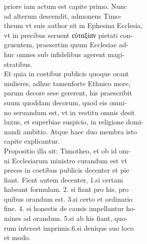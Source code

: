\documentclass{article}
\begin{document}
\begin{pages}
                priore iam actum est capite primo. Nunc \\
                ad alterum descendit, admonens Timo- \\
                theum vt suis author sit in Ephesina Ecclesia, \\
                vt in precibus seruent εὐταξίαν pietati con- \\
                gruentem, praesertim quum Ecclesiae ad- \\
                huc omnes sub infidelibus agerent magi- \\
                stratibus. \\
                Et quia in coetibus publicis quoque orant \\
                mulieres, adhuc tamenforte Ethnico more, \\
                parum decore sese gererent, his praescribit \\
                suum quoddam decorum, quod eis omni- \\
                no seruandum est, vt in vestitu omnis desit \\
                luxus, et superbiae suspicio, in religione domi- \\
                nandi ambitio. Atque haec duo membra isto \\
                capite explicantur. \\
                Propositio illa sit: Timotheo, et ob id om- \\
                ni Ecclesiarum ministro curandum est vt \\
                preces in coetibus publicis decenter et pie \\
                fiant. Fient autem decenter, 1.si certam \\
                habeant formulam. 2. si fiant pro his, pro \\
                quibus orandum est. 3.si certo et ordinario \\
                fine. 4. si honestis de causis impellantur ho- \\
                mines ad orandum. 5.si ab his fiant, quo- \\
                rum interest imprimis.6.si denique suo loco \\
                et modo. \\

\end{pages}
\end{document}
